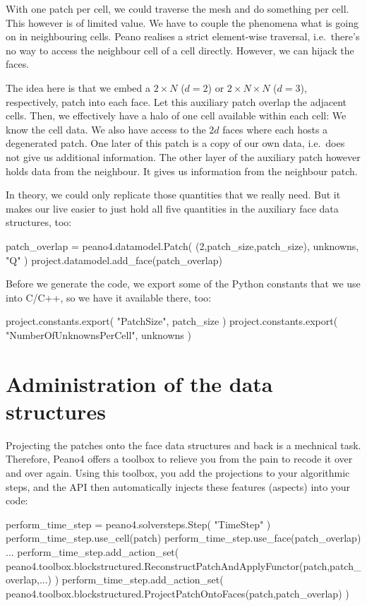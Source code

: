 With one patch per cell, we could traverse the mesh and do something per cell.
This however is of limited value.
We have to couple the phenomena what is going on in neighbouring cells.
Peano realises a strict element-wise traversal, i.e.~there's no way to access
the neighbour cell of a cell directly.
However, we can hijack the faces.


The idea here is that we embed a $2 \times N$ ($d=2$) or $2 \times N \times N$
($d=3$), respectively, patch into each face. 
Let this auxiliary patch overlap the adjacent cells.
Then, we effectively have a halo of one cell available within each cell:
We know the cell data. 
We also have access to the $2d$ faces where each hosts a degenerated patch.
One later of this patch is a copy of our own data, i.e.~does not give us
additional information.
The other layer of the auxiliary patch however holds data from the neighbour.
It gives us information from the neighbour patch.


In theory, we could only replicate those quantities that we really need. 
But it makes our live easier to just hold all five quantities in the auxiliary
face data structures, too:

\begin{code}
patch_overlap = peano4.datamodel.Patch( (2,patch_size,patch_size), unknowns, "Q" )
project.datamodel.add_face(patch_overlap)
\end{code}


Before we generate the code, we export some of the Python constants that we use
into C/C++, so we have it available there, too:

\begin{code}
project.constants.export( "PatchSize", patch_size )
project.constants.export( "NumberOfUnknownsPerCell", unknowns )
\end{code}


\section{Administration of the data structures}

Projecting the patches onto the face data structures and back is a mechnical
task.
Therefore, Peano4 offers a toolbox to relieve you from the pain to 
recode it over and over again.
Using this toolbox, you add the projections to your algorithmic steps, and the
API then automatically injects these features (aspects) into your code:

\begin{code}
perform_time_step      = peano4.solversteps.Step( "TimeStep" )
perform_time_step.use_cell(patch)
perform_time_step.use_face(patch_overlap)
...
perform_time_step.add_action_set( 
  peano4.toolbox.blockstructured.ReconstructPatchAndApplyFunctor(patch,patch_overlap,...)
) 
perform_time_step.add_action_set( 
  peano4.toolbox.blockstructured.ProjectPatchOntoFaces(patch,patch_overlap) 
)
\end{code}



